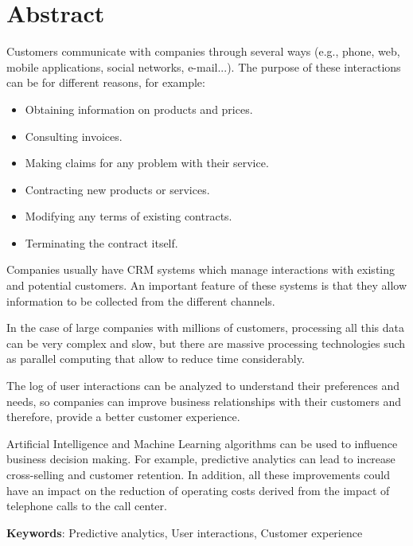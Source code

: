 \chapter*{Abstract}

\onehalfspacing

Customers communicate with companies through several ways (e.g., phone, web, mobile applications, social networks, e-mail...). The purpose of these interactions can be for different reasons, for example:
\begin{itemize}
  \item Obtaining information on products and prices.
  \item Consulting invoices.
  \item Making claims for any problem with their service.
  \item Contracting new products or services.
  \item Modifying any terms of existing contracts.
  \item Terminating the contract itself.
\end{itemize}

Companies usually have CRM systems which manage interactions with existing and potential customers. An important feature of these systems is that they allow information to be collected from the different channels.

In the case of large companies with millions of customers, processing all this data can be very complex and slow, but there are massive processing technologies such as parallel computing that allow to reduce time considerably.

The log of user interactions can be analyzed to understand their preferences and needs, so companies can improve business relationships with their customers and therefore, provide a better customer experience.

Artificial Intelligence and Machine Learning algorithms can be used to influence business decision making. For example, predictive analytics can lead to increase cross-selling and customer retention. In addition, all these improvements could have an impact on the reduction of operating costs derived from the impact of telephone calls to the call center. 

\vspace{1.5cm}

\textbf{Keywords}: Predictive analytics, User interactions, Customer experience 


